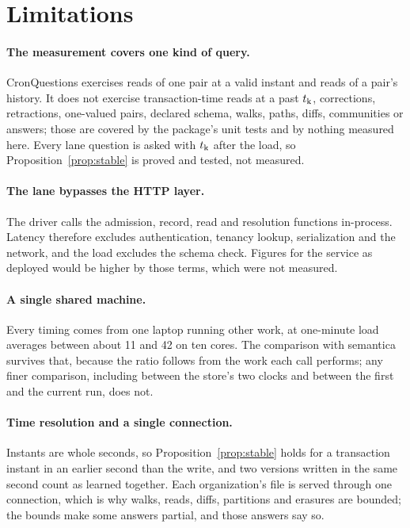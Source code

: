 \section{Limitations}
\label{sec:limits}

\paragraph{The measurement covers one kind of query.}
CronQuestions exercises reads of one pair at a valid instant and reads of a
pair's history. It does not exercise transaction-time reads at a past $t_{\mathrm{k}}$,
corrections, retractions, one-valued pairs, declared schema, walks, paths,
diffs, communities or answers; those are covered by the package's unit tests and
by nothing measured here. Every lane question is asked with $t_{\mathrm{k}}$ after the load,
so Proposition~\ref{prop:stable} is proved and tested, not measured.

\paragraph{The lane bypasses the HTTP layer.}
The driver calls the admission, record, read and resolution functions in-process.
Latency therefore excludes authentication, tenancy lookup, serialization and the
network, and the load excludes the schema check. Figures for the service as
deployed would be higher by those terms, which were not measured.

\paragraph{A single shared machine.}
Every timing comes from one laptop running other work, at one-minute load
averages between about 11 and 42 on ten cores. The comparison with semantica
survives that, because the ratio follows from the work each call performs; any
finer comparison, including between the store's two clocks and between the first
and the current run, does not.

\paragraph{Time resolution and a single connection.}
Instants are whole seconds, so Proposition~\ref{prop:stable} holds for a
transaction instant in an earlier second than the write, and two versions
written in the same second count as learned together. Each organization's file
is served through one connection, which is why walks, reads, diffs, partitions
and erasures are bounded; the bounds make some answers partial, and those
answers say so.


